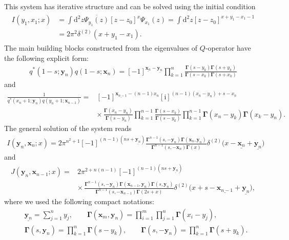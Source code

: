 \documentclass[10pt,a4paper]{amsart}
\renewcommand{\imath}{\mathrm{i}}
\numberwithin{equation}{section}
\begin{document}
This system has iterative structure and can be solved using the initial condition
\begin{align*}
\begin{split}
I(y_1,x_{1};x) & =
\int \mathrm{d}^{2} z
\overline{\Psi_{y_1}(z)}
[z-z_0]^{x} \Psi_{x_{1}}(z) =
\int \mathrm{d}^{2} z
[z-z_0]^{x+y_1-x_1 -1} \\
& = 2\pi^2\delta^{(2)}(x+y_1-x_1).
\end{split}
\end{align*}
The main building blocks constructed from the eigenvalues of $Q$-operator
have the following explicit form:
\begin{align*}
q^{*}(1-s;\bm{y}_{n}) q(1-s;\bm{x}_{n}) =
[-1]^{\underline{\bm{x}_{n}}-\underline{\bm{y}_{n}}}
\prod_{k=1}^{n}\frac{\mathbf{\Gamma}(s - y_k)\mathbf{\Gamma}(s + y_k)}{\mathbf{\Gamma}(s - x_k)\mathbf{\Gamma}(s + x_k)}
\end{align*}
and
\begin{align*}
\frac{1}{q^{*}(x_n+1;\bm{y}_{n}) q(y_n+1;\bm{x}_{n-1})} ={}&
[-1]^{\underline{\bm{x}_{n-1}}-(n-1)x_n}
[\imath]^{(n-1)(x_n-y_n)+s-x_n} \\
& {\times}\,
\frac{\mathbf{\Gamma}(x_n-y_n)}{\mathbf{\Gamma}(s-y_n)}
\prod_{k=1}^{n-1}\frac{\mathbf{\Gamma}(s -x_k)}{\mathbf{\Gamma}(s -y_k)}
\prod_{k=1}^{n-1}\mathbf{\Gamma}(x_n-y_k) \mathbf{\Gamma}(x_k-y_n) .
\end{align*}
The general solution of the system reads
\begin{align*}
I(\bm{y}_n,\bm{x}_{n};x) = 2\pi^{n^2+1} [-1]^{(n-1)(ns+\underline{\bm{y}_n})} \frac{\mathbf{\Gamma}^{n-1}(s ,-\bm{y}_n) \mathbf{\Gamma}(\bm{x}_n,\bm{y}_n)}
{\mathbf{\Gamma}^{n-1}(s ,-\bm{x}_n) \mathbf{\Gamma}(x)}
 \delta^{(2)}\bigl(x-\underline{\bm{x}_n}+\underline{\bm{y}_n}\bigr)
\end{align*}
and
\begin{align}
\nonumber
J(\bm{y}_n,\bm{x}_{n-1};x) ={}&
2\pi^{2+n(n-1)}[-1]^{(n-1)(ns+\underline{\bm{y}_n})} \\
& \label{Jn2}
{\times}\,
\frac{\mathbf{\Gamma}^{n-1}(s ,-\bm{y}_n) \mathbf{\Gamma}(\bm{x}_{n-1},\bm{y}_n)
\mathbf{\Gamma}(s ,\bm{y}_n)}
{\mathbf{\Gamma}^{n-1}(s ,-\bm{x}_{n-1}) \mathbf{\Gamma}(2s+x)}
 \delta^{(2)}\bigl(x+s-\underline{\bm{x}_{n-1}}+\underline{\bm{y}_n}\bigr) ,
\end{align}
where we used the following compact notations:
\begin{align*}
	&
	\underline{\bm{y}_n} = \sum\limits_{j=1}^n y_j ,\qquad
	\mathbf{\Gamma}(\bm{x}_{m},\bm{y}_n) =
	\prod\limits_{i=1}^{m}\prod\limits_{j=1}^n\mathbf{\Gamma}(x_i-y_j) , \\
	&
	\mathbf{\Gamma}(s ,\bm{y}_n) = \prod\limits_{k=1}^n\mathbf{\Gamma}(s - y_k) ,\qquad \mathbf{\Gamma}(s ,-\bm{y}_n) = \prod\limits_{k=1}^n\mathbf{\Gamma}(s + y_k) .
\end{align*}
\end{document}
